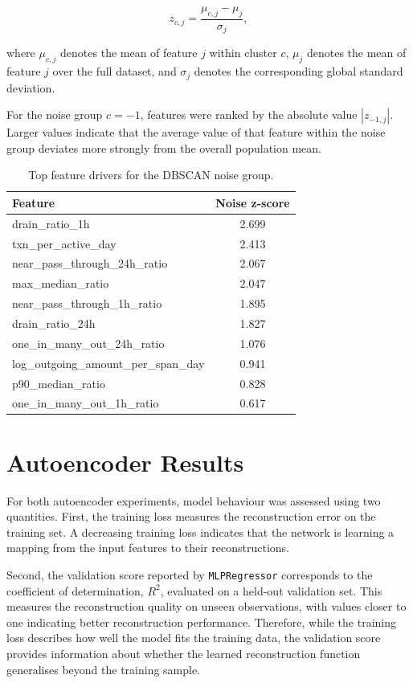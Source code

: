 \begin{equation*}
z_{c,j}
=
\frac{\mu_{c,j}-\mu_j}{\sigma_j},
\end{equation*}

where \(\mu_{c,j}\) denotes the mean of feature \(j\) within cluster \(c\),
\(\mu_j\) denotes the mean of feature \(j\) over the full dataset, and
\(\sigma_j\) denotes the corresponding global standard deviation.

For the noise group \(c=-1\), features were ranked by the absolute value
\(|z_{-1,j}|\). Larger values indicate that the average value of that feature
within the noise group deviates more strongly from the overall population mean.

\begin{table}[H]
\centering
\begin{tabular}{lc}
\hline
Feature & Noise z-score \\
\hline
drain\_ratio\_1h & 2.699 \\
txn\_per\_active\_day & 2.413 \\
near\_pass\_through\_24h\_ratio & 2.067 \\
max\_median\_ratio & 2.047 \\
near\_pass\_through\_1h\_ratio & 1.895 \\
drain\_ratio\_24h & 1.827 \\
one\_in\_many\_out\_24h\_ratio & 1.076 \\
log\_outgoing\_amount\_per\_span\_day & 0.941 \\
p90\_median\_ratio & 0.828 \\
one\_in\_many\_out\_1h\_ratio & 0.617 \\
\hline
\end{tabular}
\caption{Top feature drivers for the DBSCAN noise group.}
\label{tab:dbscan_top_drivers}
\end{table}

\section{Autoencoder Results}
For both autoencoder experiments, model behaviour was assessed using two quantities.
First, the training loss measures the reconstruction error on the training set. A decreasing
training loss indicates that the network is learning a mapping from the input features to
their reconstructions.

Second, the validation score reported by \texttt{MLPRegressor} corresponds to the
coefficient of determination, \(R^2\), evaluated on a held-out validation set. This measures
the reconstruction quality on unseen observations, with values closer to one indicating
better reconstruction performance. Therefore, while the training loss describes how well
the model fits the training data, the validation score provides information about whether
the learned reconstruction function generalises beyond the training sample.

